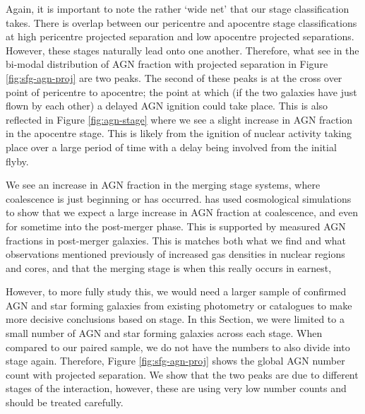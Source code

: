 Again, it is important to note the rather `wide net' that our stage classification takes. There is overlap between our pericentre and apocentre stage classifications at high pericentre projected separation and low apocentre projected separations. However, these stages naturally lead onto one another. Therefore, what see in the bi-modal distribution of AGN fraction with projected separation in Figure \ref{fig:sfg-agn-proj} are two peaks. The second of these peaks is at the cross over point of pericentre to apocentre; the point at which (if the two galaxies have just flown by each other) a delayed AGN ignition could take place. This is also reflected in Figure \ref{fig:agn-stage} where we see a slight increase in AGN fraction in the apocentre stage. This is likely from the ignition of nuclear activity taking place over a large period of time with a delay being involved from the initial flyby.

We see an increase in AGN fraction in the merging stage systems, where coalescence is just beginning or has occurred. \citet{2023MNRAS.519.4966B} has used cosmological simulations to show that we expect a large increase in AGN fraction at coalescence, and even for sometime into the post-merger phase. This is supported by measured AGN fractions in post-merger galaxies. This is matches both what we find and what observations mentioned previously of increased gas densities in nuclear regions and cores, and that the merging stage is when this really occurs in earnest,

However, to more fully study this, we would need a larger sample of confirmed AGN and star forming galaxies from existing photometry or catalogues to make more decisive conclusions based on stage. In this Section, we were limited to a small number of AGN and star forming galaxies across each stage. When compared to our paired sample, we do not have the numbers to also divide into stage again. Therefore, Figure \ref{fig:sfg-agn-proj} shows the global AGN number count with projected separation. We show that the two peaks are due to different stages of the interaction, however, these are using very low number counts and should be treated carefully.

